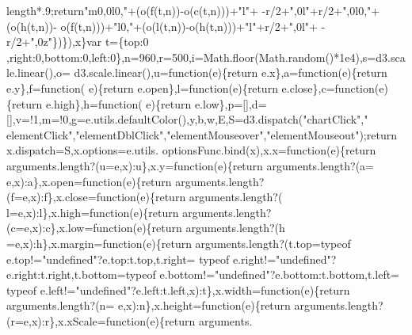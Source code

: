 \begin{DoxyCode}
      length*.9;\textcolor{keywordflow}{return}\textcolor{stringliteral}{"m0,0l0,"}+(o(f(t,n))-o(c(t,n)))+\textcolor{stringliteral}{"l"}+ -r/2+\textcolor{stringliteral}{",0l"}+r/2+\textcolor{stringliteral}{",0l0,"}+(o(h(t,n))-
      o(f(t,n)))+\textcolor{stringliteral}{"l0,"}+(o(l(t,n))-o(h(t,n)))+\textcolor{stringliteral}{"l"}+r/2+\textcolor{stringliteral}{",0l"}+ -r/2+\textcolor{stringliteral}{",0z"}\})\}),x\}var t=\{top:0
,right:0,bottom:0,left:0\},n=960,r=500,i=Math.floor(Math.random()*1e4),s=d3.scale.linear(),o=
      d3.scale.linear(),u=\textcolor{keyword}{function}(e)\{\textcolor{keywordflow}{return} e.x\},a=\textcolor{keyword}{function}(e)\{\textcolor{keywordflow}{return} e.y\},f=\textcolor{keyword}{function}(
      e)\{\textcolor{keywordflow}{return} e.open\},l=\textcolor{keyword}{function}(e)\{\textcolor{keywordflow}{return} e.close\},c=\textcolor{keyword}{function}(e)\{\textcolor{keywordflow}{return} e.high\},h=\textcolor{keyword}{function}(
      e)\{\textcolor{keywordflow}{return} e.low\},p=[],d=[],v=!1,m=!0,g=e.utils.defaultColor(),y,b,w,E,S=d3.dispatch(\textcolor{stringliteral}{"chartClick"},\textcolor{stringliteral}{"
      elementClick"},\textcolor{stringliteral}{"elementDblClick"},\textcolor{stringliteral}{"elementMouseover"},\textcolor{stringliteral}{"elementMouseout"});\textcolor{keywordflow}{return} x.dispatch=S,x.options=e.utils.
      optionsFunc.bind(x),x.x=\textcolor{keyword}{function}(e)\{\textcolor{keywordflow}{return} arguments.length?(u=e,x):u\},x.y=\textcolor{keyword}{function}(e)\{\textcolor{keywordflow}{return} arguments.length?(a=
      e,x):a\},x.open=\textcolor{keyword}{function}(e)\{\textcolor{keywordflow}{return} arguments.length?(f=e,x):f\},x.close=\textcolor{keyword}{function}(e)\{\textcolor{keywordflow}{return} arguments.length?(
      l=e,x):l\},x.high=\textcolor{keyword}{function}(e)\{\textcolor{keywordflow}{return} arguments.length?(c=e,x):c\},x.low=\textcolor{keyword}{function}(e)\{\textcolor{keywordflow}{return} arguments.length?(h
      =e,x):h\},x.margin=\textcolor{keyword}{function}(e)\{\textcolor{keywordflow}{return} arguments.length?(t.top=typeof e.top!=\textcolor{stringliteral}{"undefined"}?e.top:t.top,t.right=
      typeof e.right!=\textcolor{stringliteral}{"undefined"}?e.right:t.right,t.bottom=typeof e.bottom!=\textcolor{stringliteral}{"undefined"}?e.bottom:t.bottom,t.left=
      typeof e.left!=\textcolor{stringliteral}{"undefined"}?e.left:t.left,x):t\},x.width=\textcolor{keyword}{function}(e)\{\textcolor{keywordflow}{return} arguments.length?(n=
      e,x):n\},x.height=\textcolor{keyword}{function}(e)\{\textcolor{keywordflow}{return} arguments.length?(r=e,x):r\},x.xScale=\textcolor{keyword}{function}(e)\{\textcolor{keywordflow}{return} arguments.

\end{DoxyCode}
